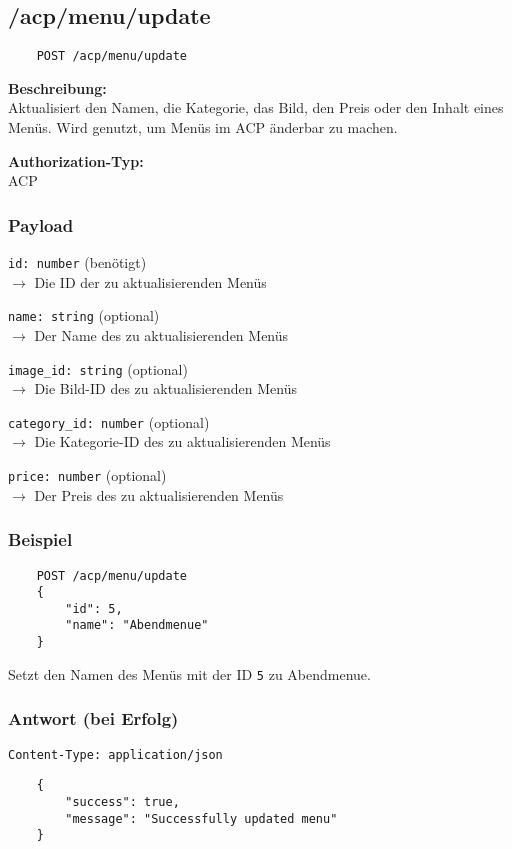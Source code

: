 \subsection{/acp/menu/update}

\begin{lstlisting}
    POST /acp/menu/update
\end{lstlisting}

\textbf{Beschreibung:} \\
Aktualisiert den Namen, die Kategorie, das Bild, den Preis oder den Inhalt eines Menüs. Wird genutzt, um Menüs im ACP änderbar zu machen.

\textbf{Authorization-Typ:} \\
ACP

\subsubsection{Payload}

\lstinline{id: number} (benötigt) \\
$\rightarrow$ Die ID der zu aktualisierenden Menüs

\lstinline{name: string} (optional) \\
$\rightarrow$ Der Name des zu aktualisierenden Menüs

\lstinline{image_id: string} (optional) \\
$\rightarrow$ Die Bild-ID des zu aktualisierenden Menüs

\lstinline{category_id: number} (optional) \\
$\rightarrow$ Die Kategorie-ID des zu aktualisierenden Menüs

\lstinline{price: number} (optional) \\
$\rightarrow$ Der Preis des zu aktualisierenden Menüs

\subsubsection{Beispiel}

\begin{lstlisting}
    POST /acp/menu/update
    {
        "id": 5,
        "name": "Abendmenue"
    }
\end{lstlisting}

Setzt den Namen des Menüs mit der ID \lstinline{5} zu \glqq Abendmenue\grqq.

\subsubsection{Antwort (bei Erfolg)}

\lstinline{Content-Type: application/json}
\begin{lstlisting}
    {
        "success": true, 
        "message": "Successfully updated menu"
    }
\end{lstlisting}